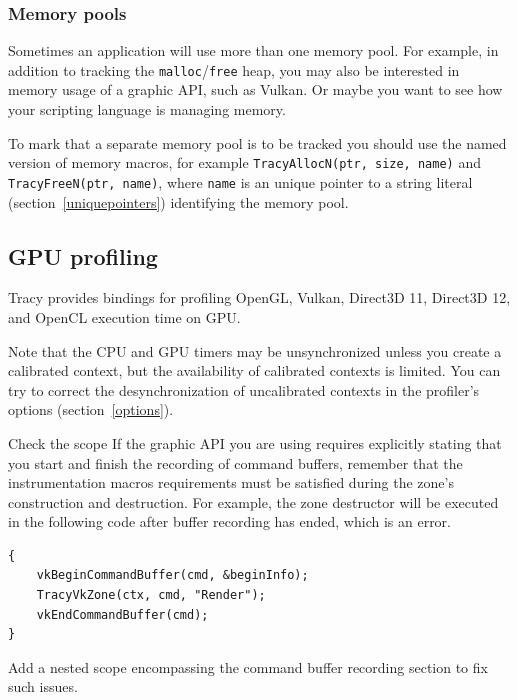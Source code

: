 \documentclass[hidelinks,titlepage,a4paper]{article}
\begin{document}
\subsubsection{Memory pools}
\label{memorypools}

Sometimes an application will use more than one memory pool. For example, in addition to tracking the \texttt{malloc}/\texttt{free} heap, you may also be interested in memory usage of a graphic API, such as Vulkan. Or maybe you want to see how your scripting language is managing memory.

To mark that a separate memory pool is to be tracked you should use the named version of memory macros, for example \texttt{TracyAllocN(ptr, size, name)} and \texttt{TracyFreeN(ptr, name)}, where \texttt{name} is an unique pointer to a string literal (section~\ref{uniquepointers}) identifying the memory pool.

\subsection{GPU profiling}
\label{gpuprofiling}

Tracy provides bindings for profiling OpenGL, Vulkan, Direct3D 11, Direct3D 12, and OpenCL execution time on GPU.

Note that the CPU and GPU timers may be unsynchronized unless you create a calibrated context, but the availability of calibrated contexts is limited. You can try to correct the desynchronization of uncalibrated contexts in the profiler's options (section~\ref{options}).

\begin{bclogo}[
noborder=true,
couleur=black!5,
logo=\bclampe
]{Check the scope}
If the graphic API you are using requires explicitly stating that you start and finish the recording of command buffers, remember that the instrumentation macros requirements must be satisfied during the zone's construction and destruction. For example, the zone destructor will be executed in the following code after buffer recording has ended, which is an error.

\begin{lstlisting}
{
    vkBeginCommandBuffer(cmd, &beginInfo);
    TracyVkZone(ctx, cmd, "Render");
    vkEndCommandBuffer(cmd);
}
\end{lstlisting}

Add a nested scope encompassing the command buffer recording section to fix such issues.
\end{bclogo}
\end{document}
